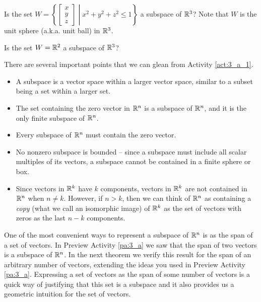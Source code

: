 \begin{activity}
\item Is the set $W = \left\{ \left[ \begin{array}{c} x \\ y \\ z \end{array} \right] \middle| x^2+y^2+z^2 \leq 1\right\}$ a subspace of $\mathbb{R}^3$? Note that $W$ is the unit sphere (a.k.a. unit ball) in $\mathbb{R}^3$.



\item Is the set $W = \mathbb{R}^2$ a subspace of $\mathbb{R}^3$?



\ea
\end{activity}



There are several important points that we can glean from Activity \ref{act:3_a_1}. 
\begin{itemize}
\item A subspace is a vector space within a larger vector space, similar to a subset being a set within a larger set.
\item The set containing the zero vector in $\mathbb{R}^n$ is a subspace of $\mathbb{R}^n$, and it is the only finite subspace of $\mathbb{R}^n$.
\item Every subspace of $\mathbb{R}^n$ must contain the zero vector.
\item No nonzero subspace is bounded -- since a subspace must include all scalar multiples of its vectors, a subspace cannot be contained in a finite sphere or box. 
\item Since vectors in $\mathbb{R}^k$ have $k$ components, vectors in $\mathbb{R}^k$ are not contained in $\mathbb{R}^n$ when $n \neq k$. However, if $n > k$, then we can think of $\mathbb{R}^n$ as containing a \emph{copy} (what we call an isomorphic image) of $\mathbb{R}^k$ as the set of vectors with zeros as the last $n-k$ components. 
\end{itemize}
 


One of the most convenient ways to represent a subspace of $\mathbb{R}^n$ is as the span of a set of vectors. In Preview Activity \ref{pa:3_a} we saw that the span of two vectors is a subspace of $\mathbb{R}^n$. In the next theorem we verify this result for the span of an arbitrary number of vectors, extending the ideas you used in Preview Activity \ref{pa:3_a}. Expressing a set of vectors as the span of some number of vectors is a quick way of justifying that this set is a subspace and it also provides us a geometric intuition for the set of vectors.



